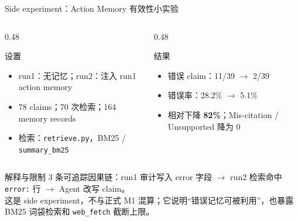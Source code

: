 \documentclass[UTF8,fontset=fandol,aspectratio=169]{ctexbeamer}
\begin{document}
\begin{frame}{Side experiment：Action Memory 有效性小实验}
  \scriptsize
  \begin{columns}[T,onlytextwidth]
    \begin{column}{0.48\textwidth}
      \begin{block}{设置}
        \begin{itemize}
          \setlength{\itemsep}{1pt}
          \item run1：无记忆；run2：注入 run1 action memory
          \item 78 claims；70 次检索；164 memory records
          \item 检索：\texttt{retrieve.py}，BM25 / \texttt{summary\_bm25}
        \end{itemize}
      \end{block}
    \end{column}
    \begin{column}{0.48\textwidth}
      \begin{alertblock}{结果}
        \begin{itemize}
          \setlength{\itemsep}{1pt}
          \item 错误 claim：11/39 $\rightarrow$ 2/39
          \item 错误率：28.2\% $\rightarrow$ 5.1\%
          \item 相对下降 \textbf{82\%}；Mis-citation / Unsupported 降为 0
        \end{itemize}
      \end{alertblock}
    \end{column}
  \end{columns}

  \vspace{0.15em}
  \begin{alertblock}{解释与限制}
    3 条可追踪因果链：run1 审计写入 error 字段 $\rightarrow$ run2 检索命中 \texttt{error:} 行 $\rightarrow$ Agent 改写 claim。\\
    这是 side experiment，不与正式 M1 混算；它说明“错误记忆可被利用”，也暴露 BM25 词袋检索和 \texttt{web\_fetch} 截断上限。
  \end{alertblock}
\end{frame}
\end{document}
